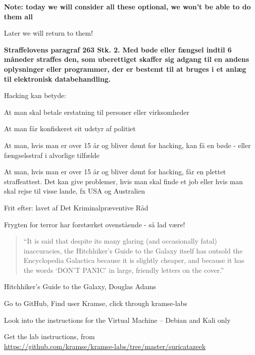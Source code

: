 \documentclass[Screen16to9,17pt]{foils}
\begin{document}
{\bf Note: today we will consider all these optional, we won't be able to do them all}

Later we will return to them!


\vskip 1cm
{\bfseries Straffelovens paragraf 263 Stk. 2. Med bøde eller fængsel
  indtil 6 måneder
straffes den, som uberettiget skaffer sig adgang til en andens
oplysninger eller programmer, der er bestemt til at bruges i et anlæg
til elektronisk databehandling.}

Hacking kan betyde:
\begin{list2}
\item At man skal betale erstatning til personer eller virksomheder
\item At man får konfiskeret sit udstyr af politiet
\item At man, hvis man er over 15 år og bliver dømt for hacking, kan
  få en bøde - eller fængselsstraf i alvorlige tilfælde
\item At man, hvis man er over 15 år og bliver dømt for hacking, får
en plettet straffeattest. Det kan give problemer, hvis man skal finde
et job eller hvis man skal rejse til visse lande, fx USA og
Australien
\item Frit efter:  lavet af Det
  Kriminalpræventive Råd
\item Frygten for terror har forstærket ovenstående - så lad være!
\end{list2}




\begin{quote}
“It is said that despite its many glaring (and occasionally fatal) inaccuracies, the Hitchhiker’s Guide to the Galaxy itself has outsold the Encyclopedia Galactica because it is slightly cheaper, and because it has the words ‘DON’T PANIC’ in large, friendly letters on the cover.”
\end{quote}
Hitchhiker’s Guide to the Galaxy, Douglas Adams


\begin{list2}
\item Go to GitHub, Find user Kramse, click through kramse-labs
\item Look into the instructions for the Virtual Machine -- Debian and Kali only

\item Get the lab instructions, from\\ {\footnotesize\url{https://github.com/kramse/kramse-labs/tree/master/suricatazeek}}
\end{list2}
\end{document}
